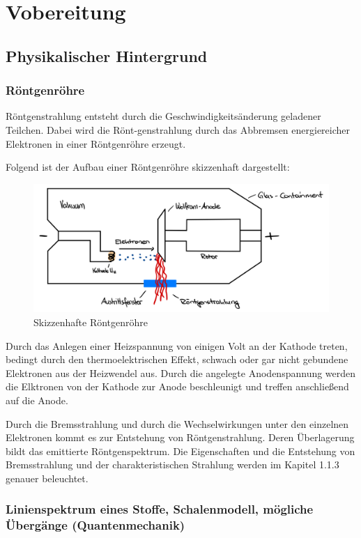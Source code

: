 \documentclass{article}
\begin{document}
\newpage


\section{Vobereitung}

\subsection{Physikalischer Hintergrund}

\subsubsection{Röntgenröhre}

\cite{medp}

Röntgenstrahlung entsteht durch die Geschwindigkeitsänderung geladener Teilchen. Dabei wird die Rönt-genstrahlung durch das Abbremsen energiereicher Elektronen in einer Röntgenröhre erzeugt.

Folgend ist der Aufbau einer Röntgenröhre skizzenhaft dargestellt:

\begin{figure}[H]
    \centering
    \includegraphics[width=0.7\linewidth]{Abbildungen/Röntgenröhre.pdf}
    \caption{Skizzenhafte Röntgenröhre}
\end{figure}

Durch das Anlegen einer Heizspannung von einigen Volt an der Kathode treten, bedingt durch den thermoelektrischen Effekt, schwach oder gar nicht gebundene Elektronen aus der Heizwendel aus. Durch die angelegte Anodenspannung werden die Elktronen von der Kathode zur Anode beschleunigt und treffen anschließend auf die Anode.

Durch die Bremsstrahlung und durch die Wechselwirkungen unter den einzelnen Elektronen kommt es zur Entstehung von Röntgenstrahlung. Deren Überlagerung bildt das emittierte Röntgenspektrum. Die Eigenschaften und die Entstehung von Bremsstrahlung und der charakteristischen Strahlung werden im Kapitel 1.1.3 genauer beleuchtet. 

\subsubsection{Linienspektrum eines Stoffe, Schalenmodell, mögliche Übergänge (Quantenmechanik)}
\end{document}
